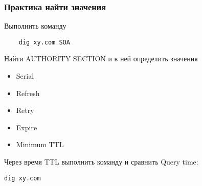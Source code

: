 \begin{frame}[fragile]
    \frametitle{Практика найти значения}

Выполнить команду
\begin{verbatim}
    dig xy.com SOA
\end{verbatim}
Найти AUTHORITY SECTION и в ней определить значения
\begin{itemize}
    \item Serial
    \item Refresh 
    \item Retry 
    \item Expire 
    \item Minimum TTL
\end{itemize}
Через время TTL выполнить команду и сравнить Query time:
\begin{verbatim}
dig xy.com
\end{verbatim}

\end{frame}